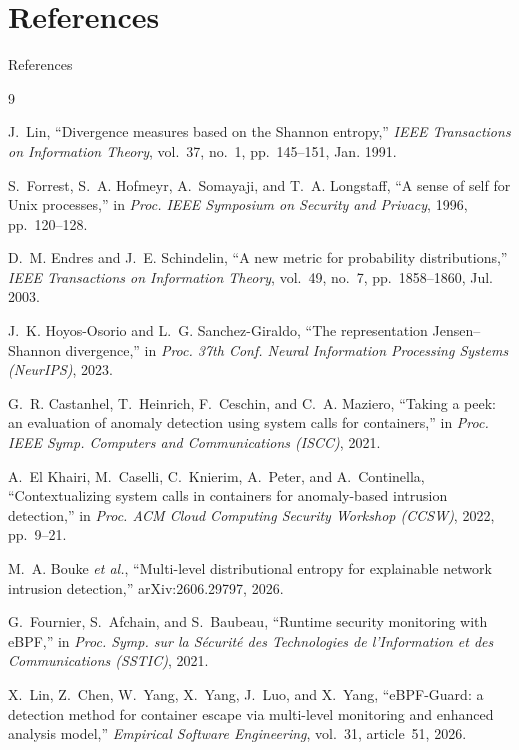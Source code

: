 \documentclass[aspectratio=169, 11pt]{beamer}
\begin{document}
\section{References}
\begin{frame}[allowframebreaks]{References}
\scriptsize
\begin{thebibliography}{9}

J.~Lin,
``Divergence measures based on the Shannon entropy,''
\emph{IEEE Transactions on Information Theory}, vol.~37, no.~1, pp.~145--151, Jan. 1991.

S.~Forrest, S.~A. Hofmeyr, A.~Somayaji, and T.~A. Longstaff,
``A sense of self for Unix processes,''
in \emph{Proc. IEEE Symposium on Security and Privacy}, 1996, pp.~120--128.

D.~M. Endres and J.~E. Schindelin,
``A new metric for probability distributions,''
\emph{IEEE Transactions on Information Theory}, vol.~49, no.~7, pp.~1858--1860, Jul. 2003.

J.~K. Hoyos-Osorio and L.~G. Sanchez-Giraldo,
``The representation Jensen--Shannon divergence,''
in \emph{Proc. 37th Conf. Neural Information Processing Systems (NeurIPS)}, 2023.

G.~R. Castanhel, T.~Heinrich, F.~Ceschin, and C.~A. Maziero,
``Taking a peek: an evaluation of anomaly detection using system calls
for containers,''
in \emph{Proc. IEEE Symp. Computers and Communications (ISCC)}, 2021.

A.~El Khairi, M.~Caselli, C.~Knierim, A.~Peter, and A.~Continella,
``Contextualizing system calls in containers for anomaly-based intrusion
detection,''
in \emph{Proc. ACM Cloud Computing Security Workshop (CCSW)}, 2022, pp.~9--21.

M.~A. Bouke \emph{et al.},
``Multi-level distributional entropy for explainable network intrusion
detection,'' arXiv:2606.29797, 2026.

G.~Fournier, S.~Afchain, and S.~Baubeau,
``Runtime security monitoring with eBPF,''
in \emph{Proc. Symp. sur la S\'ecurit\'e des Technologies de l'Information et
des Communications (SSTIC)}, 2021.

X.~Lin, Z.~Chen, W.~Yang, X.~Yang, J.~Luo, and X.~Yang,
``eBPF-Guard: a detection method for container escape via multi-level
monitoring and enhanced analysis model,''
\emph{Empirical Software Engineering}, vol.~31, article~51, 2026.


\end{thebibliography}
\end{frame}
\end{document}
